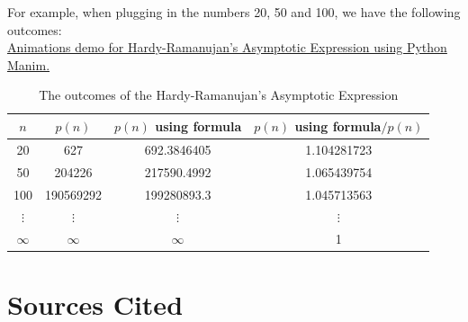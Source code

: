 \documentclass{article}
\begin{document}
\noindent For example, when plugging in the numbers 20, 50 and 100, we have the following outcomes:\\

\noindent \href{https://youtu.be/UYjqhT5xnsY}{Animations demo for Hardy-Ramanujan’s Asymptotic Expression using Python Manim.}\cite{manim}


\begin{table}[h!] %
    \centering %
    \begin{tabular}{|c|c|c|c|}
        \hline
        $n$ & $p(n)$ & $p(n)$ using formula & $p(n)$ using formula$/p(n)$ \\
        \hline
        20 & 627 & 692.3846405 & 1.104281723 \\
        50 & 204226 & 217590.4992 & 1.065439754 \\
        100 & 190569292 & 199280893.3 & 1.045713563 \\
        $\vdots$ & $\vdots$ & $\vdots$ & $\vdots$ \\
        $\infty$ & $\infty$ & $\infty$ & 1 \\
        \hline
    \end{tabular}
    \caption{The outcomes of the Hardy-Ramanujan’s Asymptotic Expression} 
\end{table}

\newpage
\section{Sources Cited}
\printbibliography
\end{document}
